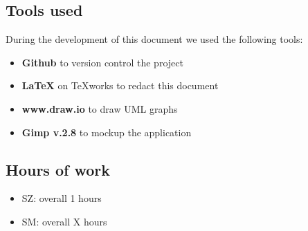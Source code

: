 \documentclass[11pt]{article} %
\begin{document}
\subsection{Tools used}
During the development of this document we used the following tools:
\begin{itemize}
	\item \textbf{Github} to version control the project
	\item \textbf{\LaTeX} on TeXworks to redact this document
	\item \textbf{www.draw.io} to draw UML graphs
	\item \textbf{Gimp v.2.8} to mockup the application
\end{itemize}

\subsection{Hours of work}
\begin{itemize}
	\item SZ: overall 1 hours
	\item SM: overall X hours
\end{itemize}
\end{document}
